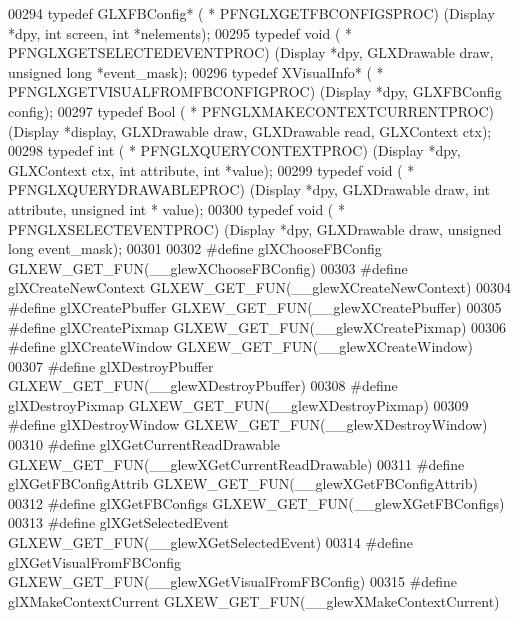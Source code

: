 \begin{DoxyCode}
00294 \textcolor{keyword}{typedef} GLXFBConfig* ( * PFNGLXGETFBCONFIGSPROC) (Display *dpy, \textcolor{keywordtype}{int} screen, \textcolor{keywordtype}{int} *nelements);
00295 \textcolor{keyword}{typedef} void ( * PFNGLXGETSELECTEDEVENTPROC) (Display *dpy, GLXDrawable draw, \textcolor{keywordtype}{unsigned} \textcolor{keywordtype}{long} *event\_mask);
00296 \textcolor{keyword}{typedef} XVisualInfo* ( * PFNGLXGETVISUALFROMFBCONFIGPROC) (Display *dpy, GLXFBConfig config);
00297 \textcolor{keyword}{typedef} Bool ( * PFNGLXMAKECONTEXTCURRENTPROC) (Display *display, GLXDrawable draw, GLXDrawable 
      read, GLXContext ctx);
00298 \textcolor{keyword}{typedef} int ( * PFNGLXQUERYCONTEXTPROC) (Display *dpy, GLXContext ctx, \textcolor{keywordtype}{int} attribute, \textcolor{keywordtype}{int} *value);
00299 \textcolor{keyword}{typedef} void ( * PFNGLXQUERYDRAWABLEPROC) (Display *dpy, GLXDrawable draw, \textcolor{keywordtype}{int} attribute, \textcolor{keywordtype}{unsigned} \textcolor{keywordtype}{int} *
      value);
00300 \textcolor{keyword}{typedef} void ( * PFNGLXSELECTEVENTPROC) (Display *dpy, GLXDrawable draw, \textcolor{keywordtype}{unsigned} \textcolor{keywordtype}{long} event\_mask);
00301 
00302 \textcolor{preprocessor}{#define glXChooseFBConfig GLXEW\_GET\_FUN(\_\_glewXChooseFBConfig)}
00303 \textcolor{preprocessor}{#define glXCreateNewContext GLXEW\_GET\_FUN(\_\_glewXCreateNewContext)}
00304 \textcolor{preprocessor}{#define glXCreatePbuffer GLXEW\_GET\_FUN(\_\_glewXCreatePbuffer)}
00305 \textcolor{preprocessor}{#define glXCreatePixmap GLXEW\_GET\_FUN(\_\_glewXCreatePixmap)}
00306 \textcolor{preprocessor}{#define glXCreateWindow GLXEW\_GET\_FUN(\_\_glewXCreateWindow)}
00307 \textcolor{preprocessor}{#define glXDestroyPbuffer GLXEW\_GET\_FUN(\_\_glewXDestroyPbuffer)}
00308 \textcolor{preprocessor}{#define glXDestroyPixmap GLXEW\_GET\_FUN(\_\_glewXDestroyPixmap)}
00309 \textcolor{preprocessor}{#define glXDestroyWindow GLXEW\_GET\_FUN(\_\_glewXDestroyWindow)}
00310 \textcolor{preprocessor}{#define glXGetCurrentReadDrawable GLXEW\_GET\_FUN(\_\_glewXGetCurrentReadDrawable)}
00311 \textcolor{preprocessor}{#define glXGetFBConfigAttrib GLXEW\_GET\_FUN(\_\_glewXGetFBConfigAttrib)}
00312 \textcolor{preprocessor}{#define glXGetFBConfigs GLXEW\_GET\_FUN(\_\_glewXGetFBConfigs)}
00313 \textcolor{preprocessor}{#define glXGetSelectedEvent GLXEW\_GET\_FUN(\_\_glewXGetSelectedEvent)}
00314 \textcolor{preprocessor}{#define glXGetVisualFromFBConfig GLXEW\_GET\_FUN(\_\_glewXGetVisualFromFBConfig)}
00315 \textcolor{preprocessor}{#define glXMakeContextCurrent GLXEW\_GET\_FUN(\_\_glewXMakeContextCurrent)}

\end{DoxyCode}
